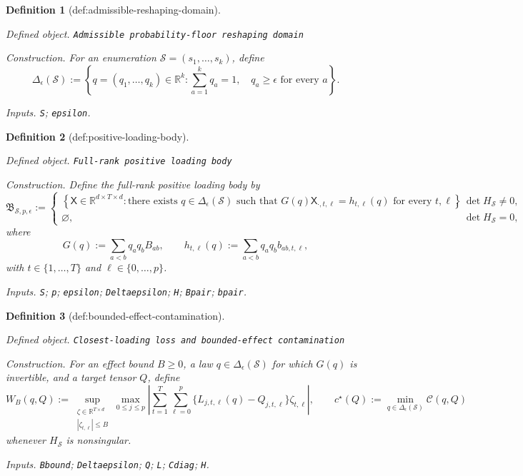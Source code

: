 \documentclass{article}
\newtheorem{definition}{Definition}
\begin{document}
\begin{definition}[def:admissible-reshaping-domain]\label{def:admissible-reshaping-domain}
\par\smallskip\noindent\emph{Defined object.} \texttt{Admissible probability-\allowbreak{}floor reshaping domain}
\par\smallskip\noindent\emph{Construction.} For an enumeration \(\mathcal S=(s_1,\ldots,s_k)\), define
\[
 \Delta_{\epsilon}(\mathcal S)
 :=\left\{q=(q_1,\ldots,q_k)\in\mathbb R^k:
          \sum_{a=1}^k q_a=1,\quad q_a\geq\epsilon
          \text{ for every }a\right\}.
\]
\par\smallskip\noindent\emph{Inputs.} \texttt{S}; \texttt{epsilon}.
\end{definition}

\begin{definition}[def:positive-loading-body]\label{def:positive-loading-body}
\par\smallskip\noindent\emph{Defined object.} \texttt{Full-\allowbreak{}rank positive loading body}
\par\smallskip\noindent\emph{Construction.} Define the full-rank positive loading body by
\[
 \mathfrak B_{\mathcal S,p,\epsilon}
 :=
 \begin{cases}
 \left\{\mathsf X\in\mathbb R^{d\times T\times d}:
 \text{there exists }q\in\Delta_{\epsilon}(\mathcal S)
 \text{ such that }
 G(q)\mathsf X_{\cdot,t,\ell}=h_{t,\ell}(q)
 \text{ for every }t,\ell\right\},
 & \det H_{\mathcal S}\neq0,\\[6pt]
 \varnothing,
 & \det H_{\mathcal S}=0,
 \end{cases}
\]
where
\[
 G(q):=\sum_{a<b}q_aq_bB_{ab},
 \qquad
 h_{t,\ell}(q):=\sum_{a<b}q_aq_bb_{ab,t,\ell},
\]
with \(t\in\{1,\ldots,T\}\) and \(\ell\in\{0,\ldots,p\}\).
\par\smallskip\noindent\emph{Inputs.} \texttt{S}; \texttt{p}; \texttt{epsilon}; \texttt{Deltaepsilon}; \texttt{H}; \texttt{Bpair}; \texttt{bpair}.
\end{definition}

\begin{definition}[def:bounded-effect-contamination]\label{def:bounded-effect-contamination}
\par\smallskip\noindent\emph{Defined object.} \texttt{Closest-\allowbreak{}loading loss and bounded-\allowbreak{}effect contamination}
\par\smallskip\noindent\emph{Construction.} For an effect bound \(B\geq0\), a law \(q\in\Delta_{\epsilon}(\mathcal S)\) for which \(G(q)\) is invertible, and a target tensor \(Q\), define
\[
 W_B(q,Q)
 :=\sup_{\substack{\zeta\in\mathbb R^{T\times d}\\
                    |\zeta_{t,\ell}|\leq B}}
       \max_{0\leq j\leq p}
       \left|\sum_{t=1}^T\sum_{\ell=0}^p
       \{L_{j,t,\ell}(q)-Q_{j,t,\ell}\}\zeta_{t,\ell}\right|,
 \qquad
 c^{\star}(Q):=\min_{q\in\Delta_{\epsilon}(\mathcal S)}\mathcal C(q,Q)
\]
whenever \(H_{\mathcal S}\) is nonsingular.
\par\smallskip\noindent\emph{Inputs.} \texttt{Bbound}; \texttt{Deltaepsilon}; \texttt{Q}; \texttt{L}; \texttt{Cdiag}; \texttt{H}.
\end{definition}
\end{document}
